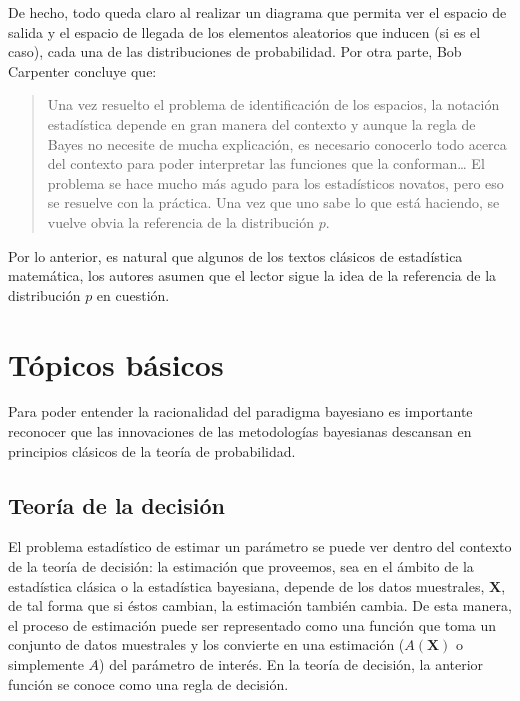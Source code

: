 \documentclass[
  10pt,
  spanish,
]{book}
\theoremstyle{definition}
\theoremstyle{definition}
\theoremstyle{definition}
\theoremstyle{definition}
\theoremstyle{remark}
\begin{document}
De hecho, todo queda claro al realizar un diagrama que permita ver el
espacio de salida y el espacio de llegada de los elementos aleatorios
que inducen (si es el caso), cada una de las distribuciones de
probabilidad. Por otra parte, Bob Carpenter concluye que:

\begin{quote}
Una vez resuelto el problema de identificación de los espacios, la notación estadística depende en gran manera del contexto y aunque la regla de Bayes no necesite de mucha explicación, es necesario conocerlo todo acerca del contexto para poder interpretar las funciones que la conforman\ldots{} El problema se hace mucho más agudo para los estadísticos novatos, pero eso se resuelve con la práctica. Una vez que uno sabe lo que está haciendo, se vuelve obvia la referencia de la distribución \(p\).
\end{quote}

Por lo anterior, es natural que algunos de los textos clásicos de
estadística matemática, los autores asumen que el lector sigue la idea
de la referencia de la distribución \(p\) en cuestión.

\hypertarget{tuxf3picos-buxe1sicos}{%
\chapter{Tópicos básicos}\label{tuxf3picos-buxe1sicos}}

Para poder entender la racionalidad del paradigma bayesiano es importante reconocer que las innovaciones de las metodologías bayesianas descansan en principios clásicos de la teoría de probabilidad.

\hypertarget{teoruxeda-de-la-decisiuxf3n}{%
\section{Teoría de la decisión}\label{teoruxeda-de-la-decisiuxf3n}}

El problema estadístico de estimar un parámetro se puede ver dentro del contexto de la teoría de decisión: la estimación que proveemos, sea en el ámbito de la estadística clásica o la estadística bayesiana, depende de los datos muestrales, \(\mathbf{X}\), de tal forma que si éstos cambian, la estimación también cambia. De esta manera, el proceso de estimación puede ser representado como una función que toma un conjunto de datos muestrales y los convierte en una estimación (\(A(\mathbf{X})\) o simplemente \(A\)) del parámetro de interés. En la teoría de decisión, la anterior función se conoce como una regla de decisión.
\end{document}
